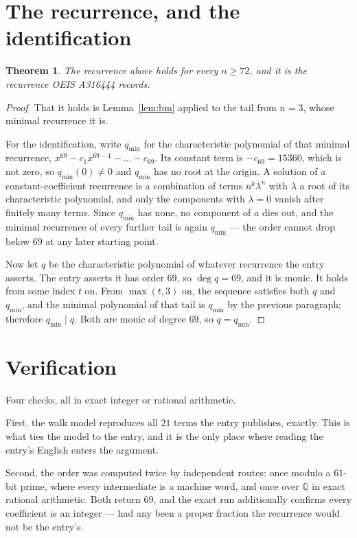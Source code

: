 \documentclass[11pt,a4paper]{article}
\theoremstyle{plain}
\newtheorem{theorem}{Theorem}
\theoremstyle{definition}
\begin{document}
\section{The recurrence, and the identification}

\begin{theorem}
The recurrence above holds for every $n\ge72$, and it is the recurrence OEIS A316444 records.
\end{theorem}

\begin{proof}
That it holds is Lemma~\ref{lem:bm} applied to the tail from $n=3$, whose minimal
recurrence it is.

For the identification, write $q_{\min}$ for the characteristic polynomial of that minimal
recurrence, $x^{69}-c_1x^{69-1}-\dots-c_{69}$. Its constant term is
$-c_{69}=15360$, which is not zero, so $q_{\min}(0)\neq0$ and $q_{\min}$ has no
root at the origin. A solution of a constant-coefficient recurrence is a combination of terms
$n^{k}\lambda^{n}$ with $\lambda$ a root of its characteristic polynomial, and only the
components with $\lambda=0$ vanish after finitely many terms. Since $q_{\min}$ has none, no
component of $a$ dies out, and the minimal recurrence of every further tail is again
$q_{\min}$ --- the order cannot drop below $69$ at any later starting point.

Now let $q$ be the characteristic polynomial of whatever recurrence the entry asserts. The
entry asserts it has order $69$, so $\deg q=69$, and it is monic. It holds from some
index $t$ on. From $\max(t,3)$ on, the sequence satisfies both $q$ and $q_{\min}$, and
the minimal polynomial of that tail is $q_{\min}$ by the previous paragraph; therefore
$q_{\min}\mid q$. Both are monic of degree $69$, so $q=q_{\min}$.
\end{proof}

\section{Verification}

Four checks, all in exact integer or rational arithmetic.

First, the walk model reproduces all $21$ terms the entry publishes, exactly. This is
what ties the model to the entry, and it is the only place where reading the entry's English
enters the argument.

Second, the order was computed twice by independent routes: once modulo a $61$-bit prime, where
every intermediate is a machine word, and once over $\mathbb{Q}$ in exact rational arithmetic.
Both return $69$, and the exact run additionally confirms every coefficient is an integer
--- had any been a proper fraction the recurrence would not be the entry's.
\end{document}
